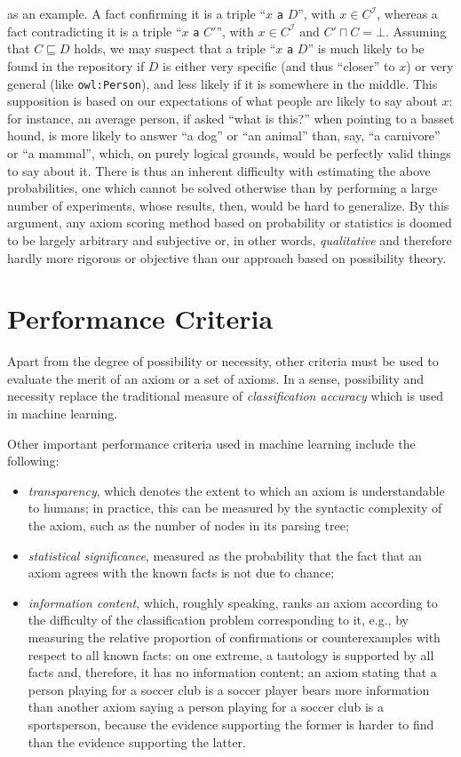 \documentclass[a4paper]{article}
\newcounter{ex}
\begin{document}
as an example. A fact confirming it is a triple ``$x$ \texttt{a} $D$'', with $x\in C^\mathcal{I}$,
whereas a fact contradicting it is a triple ``$x$ \texttt{a} $C'$'', with $x\in C^\mathcal{I}$
and $C' \sqcap C = \bot$. Assuming that $C \sqsubseteq D$ holds, we may suspect that
a triple ``$x$ \texttt{a} $D$'' is much likely to be found in the repository
if $D$ is either very specific (and thus ``closer'' to $x$) or very general (like
\texttt{owl:Person}), and less likely if it is somewhere in the middle.
This supposition is based on our expectations of what people are likely to say
about $x$: for instance, an average person, if asked ``what is this?'' when pointing
to a basset hound, is more likely to answer ``a dog'' or ``an animal'' than,
say, ``a carnivore'' or ``a mammal'', which, on purely logical grounds,
would be perfectly valid things to say about it.
There is thus an inherent difficulty with estimating the above probabilities,
one which cannot be solved otherwise than by performing a large number of
experiments, whose results, then, would be hard to generalize.
By this argument, any axiom scoring method based on probability or statistics is doomed
to be largely arbitrary and subjective or, in other words, \emph{qualitative}
and therefore hardly more rigorous or objective than our approach based on possibility theory.

\section{Performance Criteria}

Apart from the degree of possibility or necessity, other criteria must be used to
evaluate the merit of an axiom or a set of axioms. In a sense, possibility and
necessity replace the traditional measure of \emph{classification accuracy} which
is used in machine learning.

Other important performance criteria used in machine learning include the following:
\begin{itemize}
\item \emph{transparency}, which denotes the extent to which an axiom is understandable
  to humans; in practice, this can be measured by the syntactic complexity of the axiom,
  such as the number of nodes in its parsing tree;
\item \emph{statistical significance}, measured as the probability
  that the fact that an axiom agrees with the known facts is not due to chance;
\item \emph{information content}, which, roughly speaking, ranks an axiom according
  to the difficulty of the classification problem corresponding to it, e.g., by
  measuring the relative proportion of confirmations or counterexamples with respect
  to all known facts: on one extreme, a tautology is supported by all facts and,
  therefore, it has no information content; an axiom stating that
  a person playing for a soccer club is a soccer player bears more information
  than another axiom saying a person playing for a soccer club is a sportsperson,
  because the evidence supporting the former is harder to find than the evidence
  supporting the latter.
\end{itemize}
\end{document}

